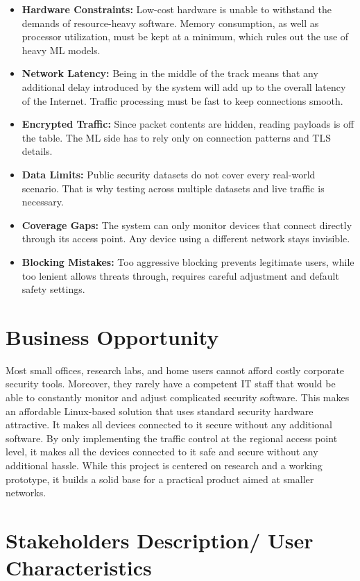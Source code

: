 \begin{itemize}
\item \textbf{Hardware Constraints:} Low-cost hardware is unable to withstand the demands of resource-heavy software. Memory consumption, as well as processor utilization, must be kept at a minimum, which rules out the use of heavy ML models.
\item \textbf{Network Latency:} Being in the middle of the track means that any additional delay introduced by the system will add up to the overall latency of the Internet. Traffic processing must be fast to keep connections smooth.   
\item \textbf{Encrypted Traffic:} Since packet contents are hidden, reading payloads is off the table. The ML side has to rely only on connection patterns and TLS details.
\item \textbf{Data Limits:} Public security datasets do not cover every real-world scenario. That is why testing across multiple datasets and live traffic is necessary.
\item \textbf{Coverage Gaps:} The system can only monitor devices that connect directly through its access point. Any device using a different network stays invisible.
\item \textbf{Blocking Mistakes:} Too aggressive blocking prevents legitimate users, while too lenient allows threats through, requires careful adjustment and default safety settings.
\end{itemize}

\section{Business Opportunity}\label{sec:2.8}

\noindent Most small offices, research labs, and home users cannot afford costly corporate security tools. Moreover, they rarely have a competent IT staff that would be able to constantly monitor and adjust complicated security software. This makes an affordable Linux-based solution that uses standard security hardware attractive. It makes all devices connected to it secure without any additional software. By only implementing the traffic control at the regional access point level, it makes all the devices connected to it safe and secure without any additional hassle. While this project is centered on research and a working prototype, it builds a solid base for a practical product aimed at smaller networks.

\section{Stakeholders Description/ User Characteristics}\label{sec:2.9}

